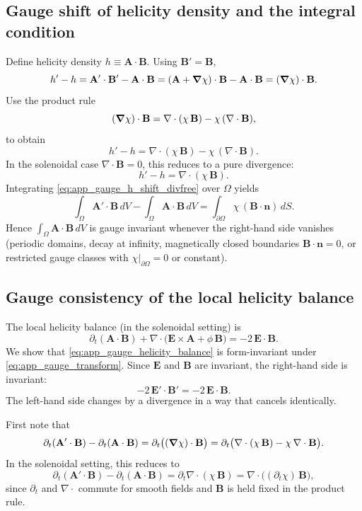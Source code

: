 \documentclass[11pt]{article}
\theoremstyle{plain}
\theoremstyle{definition}
\theoremstyle{remark}
\newcommand{\diver}{\nabla\cdot}
\newcommand{\A}{\mathbf{A}}
\newcommand{\B}{\mathbf{B}}
\newcommand{\E}{\mathbf{E}}
\begin{document}
\subsection{Gauge shift of helicity density and the integral condition}
Define helicity density $h\equiv\A\cdot\B$. Using $\B'=\B$,
\begin{equation}\label{eq:app_gauge_h_shift_start}
  h' - h
  = \A'\cdot\B' - \A\cdot\B
  = (\A+\grad\chi)\cdot\B - \A\cdot\B
  = (\grad\chi)\cdot\B.
\end{equation}
Use the product rule
\[
(\grad\chi)\cdot\B = \diver(\chi\,\B) - \chi\,(\diver\B),
\]
to obtain
\begin{equation}\label{eq:app_gauge_h_shift}
  h' - h = \diver(\chi\,\B) - \chi\,(\diver\B).
\end{equation}
In the solenoidal case $\diver\B=0$, this reduces to a pure divergence:
\begin{equation}\label{eq:app_gauge_h_shift_divfree}
  h' - h = \diver(\chi\,\B).
\end{equation}
Integrating \eqref{eq:app_gauge_h_shift_divfree} over $\Omega$ yields
\begin{equation}\label{eq:app_gauge_H_shift}
  \int_{\Omega}\A'\cdot\B\,dV - \int_{\Omega}\A\cdot\B\,dV
  = \int_{\partial\Omega}\chi\,(\B\cdot\mathbf{n})\,dS.
\end{equation}
Hence $\int_{\Omega}\A\cdot\B\,dV$ is gauge invariant whenever the right-hand side vanishes (periodic
domains, decay at infinity, magnetically closed boundaries $\B\cdot\mathbf{n}=0$, or restricted gauge
classes with $\chi|_{\partial\Omega}=0$ or constant).

\subsection{Gauge consistency of the local helicity balance}
The local helicity balance (in the solenoidal setting) is
\begin{equation}\label{eq:app_gauge_helicity_balance}
  \partial_t(\A\cdot\B) + \diver\!\big(\E\times\A + \phi\,\B\big) = -2\,\E\cdot\B.
\end{equation}
We show that \eqref{eq:app_gauge_helicity_balance} is form-invariant under
\eqref{eq:app_gauge_transform}. Since $\E$ and $\B$ are invariant, the right-hand side is invariant:
\[
-2\,\E'\cdot\B' = -2\,\E\cdot\B.
\]
The left-hand side changes by a divergence in a way that cancels identically.

First note that
\begin{equation}\label{eq:app_gauge_dt_h}
  \partial_t(\A'\cdot\B) - \partial_t(\A\cdot\B)
  = \partial_t\big((\grad\chi)\cdot\B\big)
  = \partial_t\big(\diver(\chi\,\B) - \chi\,\diver\B\big).
\end{equation}
In the solenoidal setting, this reduces to
\begin{equation}\label{eq:app_gauge_dt_h_divfree}
  \partial_t(\A'\cdot\B) - \partial_t(\A\cdot\B)
  = \partial_t\diver(\chi\,\B) = \diver\!\big((\partial_t\chi)\,\B\big),
\end{equation}
since $\partial_t$ and $\diver$ commute for smooth fields and $\B$ is held fixed in the product rule.
\end{document}
